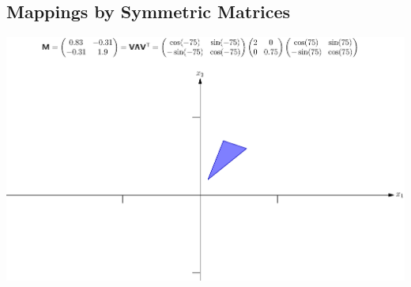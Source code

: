 \begin{slide}
\section[-2]{Mappings by Symmetric Matrices}

\pb \pause
\begin{center}
  \includegraphics[width=\linewidth]{symmatrixPicture1}
\end{center}
\end{slide}



